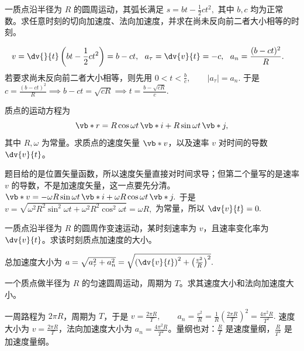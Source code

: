 \begin{exercise}[已知弧长函数时怎样分出切向与法向加速度]
一质点沿半径为 \(R\) 的圆周运动，其弧长满足
 \(s=bt-\frac12 ct^2,\) 
其中 \(b,c\) 均为正常数。求任意时刻的切向加速度、法向加速度，并求在尚未反向前二者大小相等的时刻。
\end{exercise}
\begin{solution}
\[
\begin{aligned}
v&=\dv{}{t}\left(bt-\frac12 ct^2\right)=b-ct,~~a_\tau=\dv{v}{t}=-c,~~a_n=\frac{(b-ct)^2}{R}.
\end{aligned}
\]
若要求尚未反向前二者大小相等，则先用
 \(0<t<\frac{b}{c},\qquad |a_\tau|=a_n.\) 
于是
 \(c=\frac{(b-ct)^2}{R} \implies b-ct=\sqrt{cR} \implies t=\frac{b-\sqrt{cR}}{c}.\) 
\end{solution}

\begin{exercise}
质点的运动方程为
\[
\vb*{r}=R\cos\omega t\,\vb*{i}+R\sin\omega t\,\vb*{j},
\]
其中 \(R,\omega\) 为常量。求质点的速度矢量 \(\vb*{v}\)，以及速率 \(v\) 对时间的导数 \(\dv{v}{t}\)。
\end{exercise}

\begin{solution}
题目给的是位置矢量函数，所以速度矢量直接对时间求导；但第二个量写的是速率 \(v\) 的导数，不是加速度矢量，这一点要先分清。
 \(\vb*{v} =-\omega R\sin\omega t\,\vb*{i} +\omega R\cos\omega t\,\vb*{j}.\) 
于是
 \(v=\sqrt{\omega^2R^2\sin^2\omega t+\omega^2R^2\cos^2\omega t} =\omega R,\) 
为常量，所以
 \(\dv{v}{t}=0.\) 
\end{solution}

\begin{exercise}
一质点沿半径为 \(R\) 的圆周作变速运动，某时刻速率为 \(v\)，且速率变化率为 \(\dv{v}{t}\)。求该时刻质点加速度的大小。
\end{exercise}
\begin{solution}
总加速度大小为
 \(a=\sqrt{a_\tau^2+a_n^2} =\sqrt{\left(\dv{v}{t}\right)^2+\left(\frac{v^2}{R}\right)^2}.\) 
\end{solution}

\begin{exercise}[]
一个质点做半径为 \(R\) 的匀速圆周运动，周期为 \(T\)。求其速度大小和法向加速度大小。
\end{exercise}

\begin{solution}
一周路程为 \(2\pi R\)，周期为 \(T\)，于是
 \(v=\frac{2\pi R}{T},\qquad a_n=\frac{v^2}{R} =\frac{1}{R}\left(\frac{2\pi R}{T}\right)^2 =\frac{4\pi^2R}{T^2}.\) 
速度大小为 \(v=\frac{2\pi R}{T}\)，法向加速度大小为 \(a_n=\frac{4\pi^2R}{T^2}\)。量纲也对：\(\frac{R}{T}\) 是速度量纲，\(\frac{R}{T^2}\) 是加速度量纲。
\end{solution}

